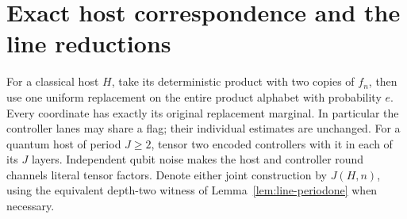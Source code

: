 \section{Exact host correspondence and the line reductions}\label{sec:line-preservation}
For a classical host $H$, take its deterministic product with two
copies of $f_n$, then use one uniform replacement on the entire
product alphabet with probability $e$. Every coordinate has exactly
its original replacement marginal. In particular the controller
lanes may share a flag; their individual estimates are unchanged.
For a quantum host of period $J\ge2$, tensor two encoded controllers
with it in each of its $J$ layers. Independent qubit noise makes the
host and controller round channels literal tensor factors. Denote
either joint construction by $J(H,n)$, using the equivalent depth-two
witness of Lemma~\ref{lem:line-periodone} when necessary.

